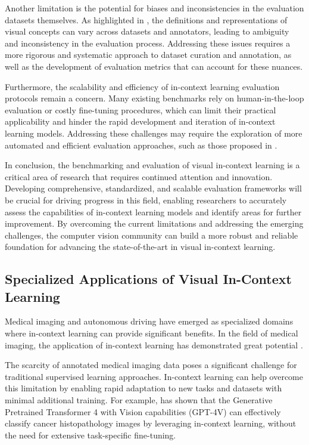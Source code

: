 \documentclass[11pt]{article}
\begin{document}
Another limitation is the potential for biases and inconsistencies in the evaluation datasets themselves. As highlighted in \cite{ref251}, the definitions and representations of visual concepts can vary across datasets and annotators, leading to ambiguity and inconsistency in the evaluation process. Addressing these issues requires a more rigorous and systematic approach to dataset curation and annotation, as well as the development of evaluation metrics that can account for these nuances.

Furthermore, the scalability and efficiency of in-context learning evaluation protocols remain a concern. Many existing benchmarks rely on human-in-the-loop evaluation or costly fine-tuning procedures, which can limit their practical applicability and hinder the rapid development and iteration of in-context learning models. Addressing these challenges may require the exploration of more automated and efficient evaluation approaches, such as those proposed in \cite{ref252}.

In conclusion, the benchmarking and evaluation of visual in-context learning is a critical area of research that requires continued attention and innovation. Developing comprehensive, standardized, and scalable evaluation frameworks will be crucial for driving progress in this field, enabling researchers to accurately assess the capabilities of in-context learning models and identify areas for further improvement. By overcoming the current limitations and addressing the emerging challenges, the computer vision community can build a more robust and reliable foundation for advancing the state-of-the-art in visual in-context learning.

\subsection{Specialized Applications of Visual In-Context Learning}

Medical imaging and autonomous driving have emerged as specialized domains where in-context learning can provide significant benefits. In the field of medical imaging, the application of in-context learning has demonstrated great potential \cite{ref253,ref254}.

The scarcity of annotated medical imaging data poses a significant challenge for traditional supervised learning approaches. In-context learning can help overcome this limitation by enabling rapid adaptation to new tasks and datasets with minimal additional training. For example, \cite{ref253} has shown that the Generative Pretrained Transformer 4 with Vision capabilities (GPT-4V) can effectively classify cancer histopathology images by leveraging in-context learning, without the need for extensive task-specific fine-tuning.
\end{document}
